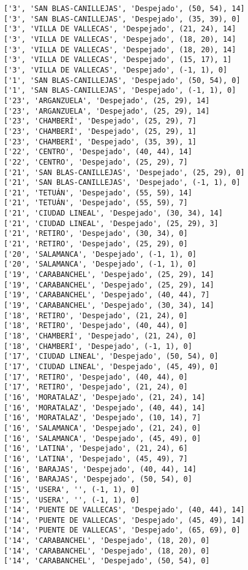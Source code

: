 \documentclass[11pt]{article}
\begin{document}
\begin{Verbatim}[commandchars=\\\{\}]
['3', 'SAN BLAS-CANILLEJAS', 'Despejado', (50, 54), 14]
['3', 'SAN BLAS-CANILLEJAS', 'Despejado', (35, 39), 0]
['3', 'VILLA DE VALLECAS', 'Despejado', (21, 24), 14]
['3', 'VILLA DE VALLECAS', 'Despejado', (18, 20), 14]
['3', 'VILLA DE VALLECAS', 'Despejado', (18, 20), 14]
['3', 'VILLA DE VALLECAS', 'Despejado', (15, 17), 1]
['3', 'VILLA DE VALLECAS', 'Despejado', (-1, 1), 0]
['1', 'SAN BLAS-CANILLEJAS', 'Despejado', (50, 54), 0]
['1', 'SAN BLAS-CANILLEJAS', 'Despejado', (-1, 1), 0]
['23', 'ARGANZUELA', 'Despejado', (25, 29), 14]
['23', 'ARGANZUELA', 'Despejado', (25, 29), 14]
['23', 'CHAMBERÍ', 'Despejado', (25, 29), 7]
['23', 'CHAMBERÍ', 'Despejado', (25, 29), 1]
['23', 'CHAMBERÍ', 'Despejado', (35, 39), 1]
['22', 'CENTRO', 'Despejado', (40, 44), 14]
['22', 'CENTRO', 'Despejado', (25, 29), 7]
['21', 'SAN BLAS-CANILLEJAS', 'Despejado', (25, 29), 0]
['21', 'SAN BLAS-CANILLEJAS', 'Despejado', (-1, 1), 0]
['21', 'TETUÁN', 'Despejado', (55, 59), 14]
['21', 'TETUÁN', 'Despejado', (55, 59), 7]
['21', 'CIUDAD LINEAL', 'Despejado', (30, 34), 14]
['21', 'CIUDAD LINEAL', 'Despejado', (25, 29), 3]
['21', 'RETIRO', 'Despejado', (30, 34), 0]
['21', 'RETIRO', 'Despejado', (25, 29), 0]
['20', 'SALAMANCA', 'Despejado', (-1, 1), 0]
['20', 'SALAMANCA', 'Despejado', (-1, 1), 0]
['19', 'CARABANCHEL', 'Despejado', (25, 29), 14]
['19', 'CARABANCHEL', 'Despejado', (25, 29), 14]
['19', 'CARABANCHEL', 'Despejado', (40, 44), 7]
['19', 'CARABANCHEL', 'Despejado', (30, 34), 14]
['18', 'RETIRO', 'Despejado', (21, 24), 0]
['18', 'RETIRO', 'Despejado', (40, 44), 0]
['18', 'CHAMBERÍ', 'Despejado', (21, 24), 0]
['18', 'CHAMBERÍ', 'Despejado', (-1, 1), 0]
['17', 'CIUDAD LINEAL', 'Despejado', (50, 54), 0]
['17', 'CIUDAD LINEAL', 'Despejado', (45, 49), 0]
['17', 'RETIRO', 'Despejado', (40, 44), 0]
['17', 'RETIRO', 'Despejado', (21, 24), 0]
['16', 'MORATALAZ', 'Despejado', (21, 24), 14]
['16', 'MORATALAZ', 'Despejado', (40, 44), 14]
['16', 'MORATALAZ', 'Despejado', (10, 14), 7]
['16', 'SALAMANCA', 'Despejado', (21, 24), 0]
['16', 'SALAMANCA', 'Despejado', (45, 49), 0]
['16', 'LATINA', 'Despejado', (21, 24), 6]
['16', 'LATINA', 'Despejado', (45, 49), 7]
['16', 'BARAJAS', 'Despejado', (40, 44), 14]
['16', 'BARAJAS', 'Despejado', (50, 54), 0]
['15', 'USERA', '', (-1, 1), 0]
['15', 'USERA', '', (-1, 1), 0]
['14', 'PUENTE DE VALLECAS', 'Despejado', (40, 44), 14]
['14', 'PUENTE DE VALLECAS', 'Despejado', (45, 49), 14]
['14', 'PUENTE DE VALLECAS', 'Despejado', (65, 69), 0]
['14', 'CARABANCHEL', 'Despejado', (18, 20), 0]
['14', 'CARABANCHEL', 'Despejado', (18, 20), 0]
['14', 'CARABANCHEL', 'Despejado', (50, 54), 0]

\end{Verbatim}
\end{document}
